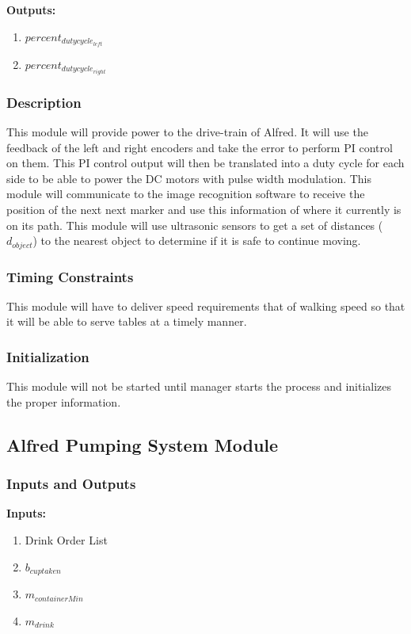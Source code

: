 \documentclass [10pt]{article}
\begin{document}
\textbf{Outputs: } 
\begin{enumerate}
	\item $ percent_{dutycycle_{left}} $
	\item $ percent_{dutycycle_{right}} $
	
\end{enumerate}

\subsubsection{Description}
This module will provide power to the drive-train of Alfred. It will use the feedback of the left and right encoders and take the error to perform PI control on them. This PI control output will then be translated into a duty cycle for each side to be able to power the DC motors with pulse width modulation. This module will communicate to the image recognition software to receive the position of the next next marker and use this information of where it currently is on its path. This module will use ultrasonic sensors to get a set of distances ($ d_{object} $) to the nearest object to determine if it is safe to continue moving.

\subsubsection{Timing Constraints}
This module will have to deliver speed requirements that of walking speed so that it will be able to serve tables at a timely manner.

\subsubsection{Initialization}
This module will not be started until manager starts the process and initializes the proper information.

\subsection{Alfred Pumping System Module}

\subsubsection{Inputs and Outputs}

\textbf{Inputs: } 
\begin{enumerate}
	\item Drink Order List
	\item $ b_{cuptaken } $
	\item $ m_{containerMin} $
	\item $ m_{drink} $
\end{enumerate}
\end{document}
